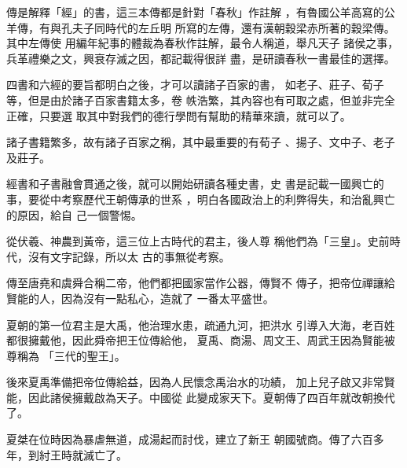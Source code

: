 \documentclass[avery5371,grid]{flashcards}
\begin{document}
{傳是解釋「經」的書，這三本傳都是針對「春秋」作註解
，有魯國公羊高寫的公羊傳，有與孔夫子同時代的左丘明
所寫的左傳，還有漢朝穀梁赤所著的穀梁傳。其中左傳使
用編年紀事的體裁為春秋作註解，最令人稱道，舉凡天子
諸侯之事，兵革禮樂之文，興衰存滅之因，都記載得很詳
盡，是研讀春秋一書最佳的選擇。} %
{} %


{四書和六經的要旨都明白之後，才可以讀諸子百家的書，
如老子、莊子、荀子等，但是由於諸子百家書籍太多，卷
帙浩繁，其內容也有可取之處，但並非完全正確，只要選
取其中對我們的德行學問有幫助的精華來讀，就可以了。} %
{} %

{諸子書籍繁多，故有諸子百家之稱，其中最重要的有荀子
、揚子、文中子、老子及莊子。} %
{} %

{經書和子書融會貫通之後，就可以開始研讀各種史書，史
書是記載一國興亡的事，要從中考察歷代王朝傳承的世系
，明白各國政治上的利弊得失，和治亂興亡的原因，給自
己一個警惕。} %
{} %

{從伏羲、神農到黃帝，這三位上古時代的君主，後人尊
稱他們為「三皇」。史前時代，沒有文字記錄，所以太
古的事無從考察。} %
{} %

{傳至唐堯和虞舜合稱二帝，他們都把國家當作公器，傳賢不
傳子，把帝位禪讓給賢能的人，因為沒有一點私心，造就了
一番太平盛世。} %
{} %

{夏朝的第一位君主是大禹，他治理水患，疏通九河，把洪水
引導入大海，老百姓都很擁戴他，因此舜帝把王位傳給他，
夏禹、商湯、周文王、周武王因為賢能被尊稱為
「三代的聖王」。} %
{} %


{後來夏禹準備把帝位傳給益，因為人民懷念禹治水的功績，
加上兒子啟又非常賢能，因此諸侯擁戴啟為天子。中國從
此變成家天下。夏朝傳了四百年就改朝換代了。} %
{} %

{夏桀在位時因為暴虐無道，成湯起而討伐，建立了新王
朝國號商。傳了六百多年，到紂王時就滅亡了。} %
{} %
\end{document}
